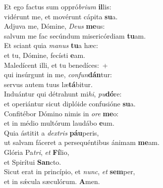 \evenverse Et ego factus sum oppró\textit{bri}\textit{um} \textbf{il}lis:~\*\\
\evenverse vidérunt me, et movérunt cápita \textbf{su}a.\\
\oddverse Adjuva me, Dómine, \textit{De}\textit{us} \textbf{me}us:~\*\\
\oddverse salvum me fac secúndum misericórdiam \textbf{tu}am.\\
\evenverse Et sciant quia \textit{ma}\textit{nus} \textbf{tu}a hæc:~\*\\
\evenverse et tu, Dómine, fecísti \textbf{e}am.\\
\oddverse Maledícent illi, et tu benedíces:~+\\
\oddverse  qui insúrgunt in me, \textit{con}\textit{fun}\textbf{dán}tur:~\*\\
\oddverse servus autem tuus læ\textbf{tá}bitur.\\
\evenverse Induántur qui détrahunt mi\textit{hi}, \textit{pu}\textbf{dó}re:~\*\\
\evenverse et operiántur sicut diplóide confusióne \textbf{su}a.\\
\oddverse Confitébor Dómino nimis in \textit{o}\textit{re} \textbf{me}o:~\*\\
\oddverse et in médio multórum laudábo \textbf{e}um.\\
\evenverse Quia ástitit a \textit{dex}\textit{tris} \textbf{páu}peris,~\*\\
\evenverse ut salvam fáceret a persequéntibus ánimam \textbf{me}am.\\
\oddverse Glória Pa\textit{tri}, \textit{et} \textbf{Fí}lio,~\*\\
\oddverse et Spirítui \textbf{San}cto.\\
\evenverse Sicut erat in princípio, et \textit{nunc}, \textit{et} \textbf{sem}per,~\*\\
\evenverse et in sǽcula sæculórum. \textbf{A}men.\\
